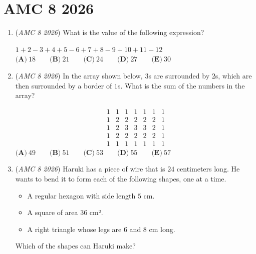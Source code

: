 \section{AMC 8 2026}
        \begin{enumerate}
        	\item (\textit{AMC 8 2026}) What is the value of the following expression?


 $1 + 2 - 3 + 4 + 5 - 6 + 7 + 8 - 9 + 10 + 11 - 12$
$\textbf{(A)}\ 18 \qquad \textbf{(B)}\ 21 \qquad \textbf{(C)}\ 24 \qquad \textbf{(D)}\ 27 \qquad \textbf{(E)}\ 30$


	\item (\textit{AMC 8 2026}) In the array shown below, $3$s are surrounded by  $2$s, which are then surrounded by a border of $1$s. What is the sum of the numbers in the array?


 
 \[\begin{array}{ccccccc} 1 & 1 & 1 & 1 & 1 & 1 & 1 \\ 1 & 2 & 2 & 2 & 2 & 2 & 1 \\ 1 & 2 & 3 & 3 & 3 & 2 & 1 \\ 1 & 2 & 2 & 2 & 2 & 2 & 1 \\ 1 & 1 & 1 & 1 & 1 & 1 & 1 \end{array}\]
$\textbf{(A)}\ 49 \qquad \textbf{(B)}\ 51 \qquad \textbf{(C)}\ 53 \qquad \textbf{(D)}\ 55 \qquad \textbf{(E)}\ 57$


	\item (\textit{AMC 8 2026}) Haruki has a piece of wire that is $24$ centimeters long. He wants to bend it to form each of the following shapes, one at a time.


 
            \begin{itemize}
        \item A regular hexagon with side length $5$ cm.
            \end{itemize}
            
            \begin{itemize}
        \item A square of area $36$ cm².
            \end{itemize}
            
            \begin{itemize}
        \item A right triangle whose legs are $6$ and $8$ cm long.
            \end{itemize}
            Which of the shapes can Haruki make?



\end{enumerate}
